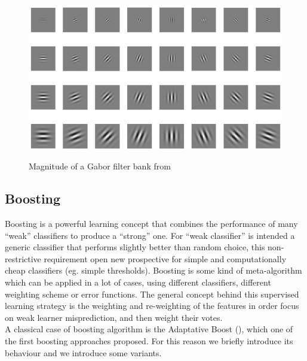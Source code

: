 \begin{figure}[!h]
\centering
\includegraphics[width=12cm]{images/gabor.png}
\label{fig:gabor}
\caption{Magnitude of a Gabor filter bank from \cite{gaborApplication} }
 \end{figure}


\newpage
\subsection{Boosting}
\label{appr:boosting}

Boosting is a powerful learning concept that combines the performance of many ``weak'' classifiers to produce a ``strong'' one. For ``weak classifier'' is intended a generic classifier that performs slightly better than random choice, this non-restrictive requirement open new prospective for simple and computationally cheap classifiers (eg. simple thresholds). Boosting is some kind of meta-algorithm which can be applied in a lot of cases, using different classifiers, different weighting scheme or error functions. The general concept behind this supervised learning strategy is the weighting and re-weighting of the features in order focus on weak learner misprediction, and then weight their votes\cite{rojas2009adaboost}.\\

A classical case of boosting algorithm is the Adaptative Boost ()\cite{Friedman98additivelogistic}, which one of the first boosting approaches proposed. For this reason we briefly introduce its behaviour and we introduce some variants.

